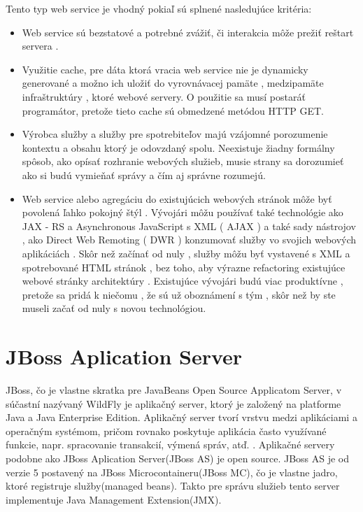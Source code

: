 Tento typ web service je vhodný pokiaľ sú splnené nasledujúce kritéria:
\begin{itemize}
  \item  Web service sú bezstatové a potrebné zvážiť, či interakcia môže prežiť reštart servera .

  \item Využitie cache, pre dáta ktorá vracia web service nie je dynamicky generované a možno ich uložiť do vyrovnávacej pamäte , medzipamäte infraštruktúry , ktoré webové servery. O použitie sa musí postaráť programátor, pretože tieto cache sú obmedzené metódou HTTP GET.

   \item   Výrobca služby a služby pre spotrebiteľov majú vzájomné porozumenie kontextu a obsahu  ktorý je odovzdaný spolu. Neexistuje žiadny formálny spôsob, ako opísať rozhranie webových služieb, musie strany sa dorozumieť ako si budú vymieňať správy a čím aj správne rozumejú.

  \item  Web service alebo agregáciu do existujúcich webových stránok môže byť povolená ľahko pokojný štýl . Vývojári môžu používať také technológie ako JAX - RS a Asynchronous JavaScript s XML ( AJAX ) a také sady nástrojov , ako Direct Web Remoting ( DWR ) konzumovať služby vo svojich webových aplikáciách . Skôr než začínať od nuly , služby môžu byť vystavené s XML a spotrebované HTML stránok , bez toho, aby výrazne refactoring existujúce webové stránky architektúry . Existujúce vývojári budú viac produktívne , pretože sa pridá k niečomu , že sú už oboznámení s tým , skôr než by ste museli začať od nuly s novou technológiou.


\end{itemize}
\chapter{JBoss Aplication Server} 
JBoss, čo je vlastne skratka pre JavaBeans Open Source Applicatom Server, v súčastní nazývaný WildFly je aplikačný server, ktorý je založený na platforme Java a Java Enterprise Edition.\cite{jbossbook} Aplikačný server tvorí vrstvu medzi aplikáciami a operačným systémom, pričom rovnako poskytuje aplikácia často využívané funkcie, napr. spracovanie transakcií, výmená správ, atď. . Aplikačné servery podobne ako JBoss Aplication Server(JBoss AS) je open source. JBoss AS je od verzie 5 postavený na JBoss Microcontaineru(JBoss MC), čo je vlastne jadro, ktoré registruje služby(managed beans). Takto pre správu služieb tento server implementuje Java Management Extension(JMX).

